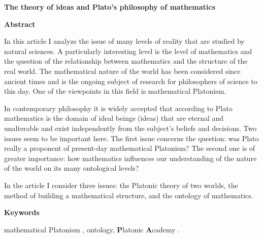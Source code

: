 \documentclass[a4paper]{article}
\title{}
\begin{document}
{\centering\bfseries
The theory of ideas and Plato’s philosophy of mathematics
\par}

{\bfseries
Abstract}

In this article I analyze the issue of many levels of reality that are studied by natural sciences. A particularly
interesting level is the level of mathematics and the question of the relationship between mathematics and the
structure of the real world. The mathematical nature of the world has been considered since ancient times and is the
ongoing subject of research for philosophers of science to this day. One of the viewpoints in this field is
mathematical Platonism.

In contemporary philosophy it is widely accepted that according to Plato mathematics is the domain of ideal beings
(ideas) that are eternal and unalterable and exist independently from the subject's beliefs and decisions. Two issues
seem to be important here. The first issue concerns the question: was Plato really a proponent of present-day
mathematical Platonism? The second one is of greater importance: how mathematics influences our understanding of the
nature of the world on its many ontological levels?

In the article I consider three issues: the Platonic theory of {\textquotedbl}two worlds{\textquotedbl}, the method of
building a mathematical structure, and the ontology of mathematics.

{\bfseries
Keywords}

mathematical Platonism%
, ontology, \textbf{P}latonic \textbf{A}cademy%
.
\end{document}
